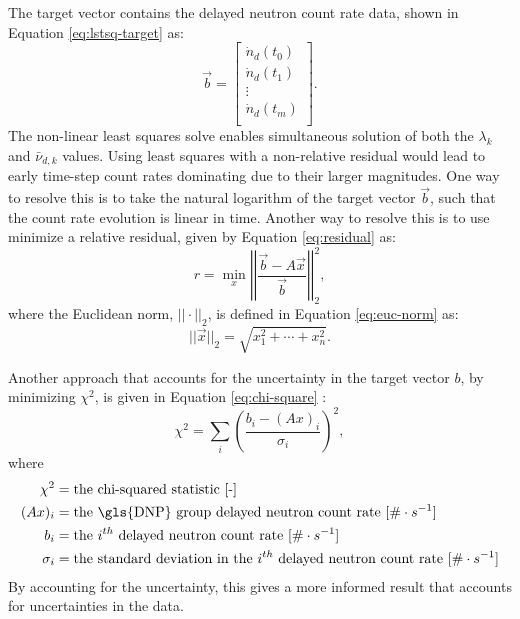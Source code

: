 The target vector contains the delayed neutron count rate data, shown in Equation \eqref{eq:lstsq-target} as:
\begin{equation}
\vec{b} = 
\begin{bmatrix}
 \dot{n}_d(t_0)  \\
 \dot{n}_d(t_1) \\
\vdots\\
\dot{n}_d(t_m)\\
\end{bmatrix}.
\label{eq:lstsq-target}
\end{equation}
The non-linear least squares solve enables simultaneous solution of both the $\lambda_k$ and $\bar{\nu}_{d,k}$ values.
Using least squares with a non-relative residual would lead to early time-step count rates dominating due to their larger magnitudes.
One way to resolve this is to take the natural logarithm of the target vector $\vec{b}$, such that the count rate evolution is linear in time.
Another way to resolve this is to use minimize a relative residual, given by Equation \eqref{eq:residual} as:
\begin{equation}
    r = \min_x \left| \left| \frac{\vec{b} - A\vec{x}}{\vec{b}} \right| \right|_2^2,
    \label{eq:residual}
\end{equation}
where the Euclidean norm, $||\cdot||_2$, is defined in Equation \ref{eq:euc-norm} as:
\begin{equation}
    ||\vec{x}||_2 = \sqrt{x_1^2 + \cdots + x_n^2}.
    \label{eq:euc-norm}
\end{equation}

Another approach that accounts for the uncertainty in the target vector $b$, by minimizing $\chi^{2}$, is given in Equation \eqref{eq:chi-square} \cite{Bevington2003Data}:
\begin{equation}
    \chi^2 = \sum_i \left( \frac{b_i - (Ax)_i}{\sigma_i} \right)^2,
    \label{eq:chi-square}
\end{equation}
where
\begin{align}
    \chi^2 &= \text{the chi-squared statistic [-]} \nonumber \\
    (Ax)_i &= \text{the \gls{DNP} group delayed neutron count rate $[\# \cdot s^{-1}]$} \nonumber \\
    b_{i} &= \text{the $i^{th}$ delayed neutron count rate $[\# \cdot s^{-1}]$} \nonumber \\
    \sigma_{i} &= \text{the standard deviation in the $i^{th}$ delayed neutron count rate $[\# \cdot s^{-1}]$} \nonumber \\
\end{align}
By accounting for the uncertainty, this gives a more informed result that accounts for uncertainties in the data.

